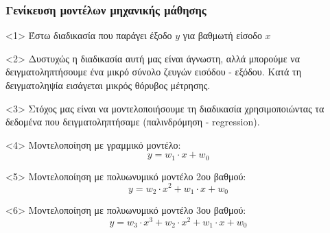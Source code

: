 \begin{frame}
  \frametitle{Γενίκευση μοντέλων μηχανικής μάθησης}
  \begin{onlyenv}<1>
    Έστω διαδικασία που παράγει έξοδο $y$ για βαθμωτή είσοδο $x$
    \begin{center}
      \scalebox{0.5}{
        
      }
    \end{center}
  \end{onlyenv}
  \begin{onlyenv}<2>
    Δυστυχώς η διαδικασία αυτή μας είναι άγνωστη, αλλά μπορούμε να
    δειγματοληπτήσουμε ένα μικρό σύνολο ζευγών εισόδου - εξόδου. Κατά τη
    δειγματοληψία εισάγεται μικρός θόρυβος μέτρησης.
    \begin{center}
      \scalebox{0.5}{
        
      }
    \end{center}
  \end{onlyenv}
  \begin{onlyenv}<3>
    Στόχος μας είναι να μοντελοποιήσουμε τη διαδικασία χρησιμοποιώντας τα
    δεδομένα που δειγματοληπτήσαμε (παλινδρόμηση - regression).
    \vspace{1cm}\\
  \end{onlyenv}
  \begin{onlyenv}<4>
    Μοντελοποίηση με γραμμικό μοντέλο:
    \begin{equation*}
      y = w_1\cdot x + w_0
    \end{equation*}
    \begin{center}
      \scalebox{0.5}{
        
      }
    \end{center}
  \end{onlyenv}
  \begin{onlyenv}<5>
    Μοντελοποίηση με πολυωνυμικό μοντέλο 2ου βαθμού:
    \begin{equation*}
      y = w_2\cdot x^2 + w_1\cdot x + w_0
    \end{equation*}
    \begin{center}
      \scalebox{0.5}{
        
      }
    \end{center}
  \end{onlyenv}
  \begin{onlyenv}<6>
    Μοντελοποίηση με πολυωνυμικό μοντέλο 3ου βαθμού:
    \begin{equation*}
      y = w_3\cdot x^3 + w_2\cdot x^2 + w_1\cdot x + w_0
    \end{equation*}

\end{onlyenv}
\end{frame}
